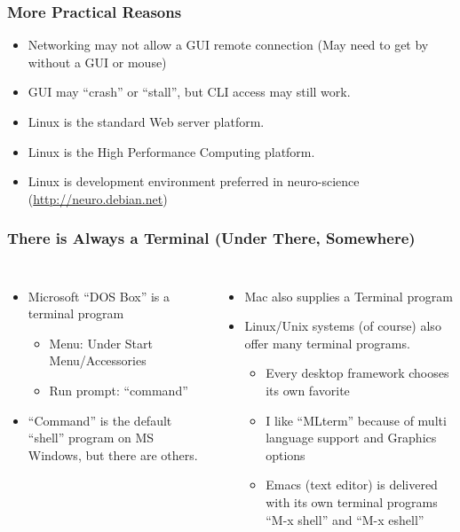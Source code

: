 \documentclass[English]{beamer}
\begin{document}
\begin{frame}
  \frametitle{More Practical Reasons}

  \begin{itemize}
  \item Networking may not allow a GUI remote connection
    (May need to get by without a GUI or mouse)
  \item GUI may ``crash'' or ``stall'', but CLI access may still work.
  \item Linux is the standard Web server platform. 
  \item Linux is the High Performance Computing platform.
  \item Linux is development environment preferred in neuro-science (\url{http://neuro.debian.net})
  \end{itemize}
\end{frame}

\begin{frame}
  \frametitle{There is Always a Terminal (Under There, Somewhere)}
  \begin{columns}
    \column{5cm}
  \begin{itemize}
  \item Microsoft ``DOS Box'' is a terminal program 
    \begin{itemize}
     \item Menu: Under Start Menu/Accessories
     \item Run prompt: ``command''   
     \end{itemize}
   \item ``Command'' is the default ``shell'' program on MS Windows,
     but there are others.
     
  \end{itemize} 
   \column{6cm}
    \begin{itemize}
     \item Mac also supplies a Terminal program
     \item Linux/Unix systems (of course) also offer many terminal
       programs.
       \begin{itemize}
       \item Every desktop framework chooses its own favorite
       \item I like ``MLterm'' because of multi language support and
         Graphics options
       \item Emacs (text editor) is delivered with its own
         terminal programs ``M-x shell'' and ``M-x eshell''
       \end{itemize}
     \end{itemize}
   \end{columns}
\end{frame}
\end{document}
